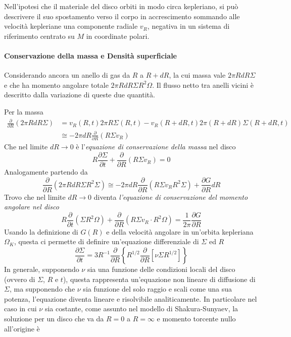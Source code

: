\documentclass[a4paperbi]{article}
\begin{document}
	Nell'ipotesi che il materiale del disco orbiti in modo circa kepleriano, si può descrivere il suo spostamento verso il corpo in accrescimento sommando alle velocità kepleriane una componente radiale $v_R$, negativa in un sistema di riferimento centrato su $M$ in coordinate polari.
	
	\paragraph{Conservazione della massa e Densità superficiale}
	Considerando ancora un anello di gas da $R$ a $R+dR$, la cui massa vale $2\pi RdR\Sigma$ e che ha momento angolare totale $2\pi RdR\Sigma R^2\Omega$. Il flusso netto tra anelli vicini è descritto dalla variazione di queste due quantità. 
	
	Per la massa
	\begin{align*}
		\frac{\partial}{\partial R}(2\pi RdR\Sigma)&=v_R(R,t)2\pi R\Sigma(R,t)-v_R(R+dR,t)2\pi(R+dR)\Sigma(R+dR,t)\\
		&\cong-2\pi dR\frac{\partial}{\partial R}(R\Sigma v_R)
	\end{align*}
	Che nel limite $dR\rightarrow 0$ è l'\textit{equazione di conservazione della massa} nel disco
	\begin{equation}
		R\frac{\partial\Sigma}{\partial t}+\frac{\partial}{\partial R}(R\Sigma v_R)=0
	\end{equation}
	Analogamente partendo da
	\begin{equation*}
		\frac{\partial}{\partial R}(2\pi RdR\Sigma R^2\Sigma)\cong-2\pi dR\frac{\partial}{\partial R}(R\Sigma v_R R^2\Sigma)+\frac{\partial G}{\partial R}dR	
	\end{equation*}
	Trovo che nel limite $dR\rightarrow 0$ diventa \textit{l'equazione di conservazione del momento angolare nel disco}
	\begin{equation}
		R\frac{\partial}{\partial t}(\Sigma R^2\Omega)+\frac{\partial}{\partial R}(R\Sigma v_R\cdot R^2\Omega)=\frac{1}{2\pi}\frac{\partial G}{\partial R}
	\end{equation}
	Usando la definizione di $G(R)$ e della velocità angolare in un'orbita kepleriana $\Omega_K$,  questa ci permette di definire un'equazione differenziale di $\Sigma$ ed $R$
	\begin{equation}
		\frac{\partial\Sigma}{\partial t}=3R^{-1}\frac{\partial}{\partial R}\left\{R^{1/2}\frac{\partial}{\partial R}\left[\nu\Sigma R^{1/2}\right]\right\}
	\end{equation}
	In generale, supponendo $\nu$ sia una funzione delle condizioni locali del disco (ovvero di $\Sigma$, $R$ e $t$), questa rappresenta un'equazione non lineare di diffusione di $\Sigma$, ma supponendo che $\nu$ sia funzione del solo raggio e scali come una sua potenza, l'equazione diventa lineare e risolvibile analiticamente. In particolare nel caso in cui $\nu$ sia costante, come assunto nel modello di Shakura-Sunyaev, la soluzione per un disco che va da $R=0$ a $R=\infty$ e momento torcente nullo all'origine è
\end{document}
